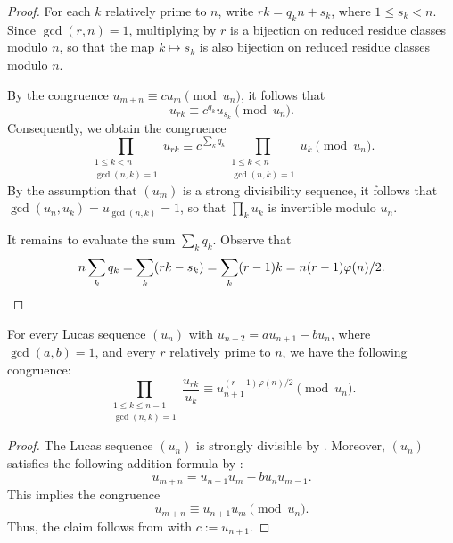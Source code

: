 \begin{proof}
  For each $k$ relatively prime to $n$, write $rk=q_kn+s_k$, where $1\leq s_k < n$. Since $\gcd(r,n)=1$, multiplying by $r$ is a bijection on reduced residue classes modulo $n$, so that the map $k\mapsto s_k$ is also bijection on reduced residue classes modulo $n$.

  By the congruence $u_{m+n}\equiv cu_m \pmod{u_n}$, it follows that
  \begin{equation*}
    u_{rk}\equiv c^{q_k} u_{s_k} \pmod{u_n}.
  \end{equation*}
  Consequently, we obtain the congruence
  \begin{equation*}
    \prod_{\substack{1\leq k<n\\ \gcd(n,k)=1}} u_{rk}\equiv c^{\sum_k q_k}\prod_{\substack{1\leq k<n\\ \gcd(n,k)=1}} u_k \pmod{u_n}.
  \end{equation*}
  By the assumption that $(u_m)$ is a strong divisibility sequence, it follows that $\gcd(u_n,u_k)=u_{\gcd(n,k)}=1$, so that $\prod_k u_k$ is invertible modulo $u_n$.

  It remains to evaluate the sum $\sum_k q_k$. Observe that
  \begin{equation*}
    n\sum_{k}q_k = \sum_{k}(rk-s_k) = \sum_{k}(r-1)k = n(r-1)\varphi(n)/2.\qedhere
  \end{equation*}
\end{proof}

\begin{corollary}\label{corollary:product-congruence-lucas-sequence}
  For every Lucas sequence $(u_n)$ with $u_{n+2}=au_{n+1}-bu_n$, where $\gcd(a,b)=1$, and every $r$ relatively prime to $n$, we have the following congruence:
  \begin{equation*}
    \prod_{\substack{1\leq k \leq n-1\\ \gcd(n,k)=1}} \frac{u_{rk}}{u_k} \equiv u_{n+1}^{(r-1)\varphi(n)/2} \pmod{u_n}.
  \end{equation*}
\end{corollary}

\begin{proof}
  The Lucas sequence $(u_n)$ is strongly divisible by . Moreover, $(u_n)$ satisfies the following addition formula by :
  \begin{equation*}
    u_{m+n}=u_{n+1}u_m-bu_nu_{m-1}.
  \end{equation*}
  This implies the congruence
  \begin{equation*}
    u_{m+n}\equiv u_{n+1}u_m\pmod{u_n}. 
  \end{equation*}
  Thus, the claim follows from  with $c:= u_{n+1}$.
\end{proof}

